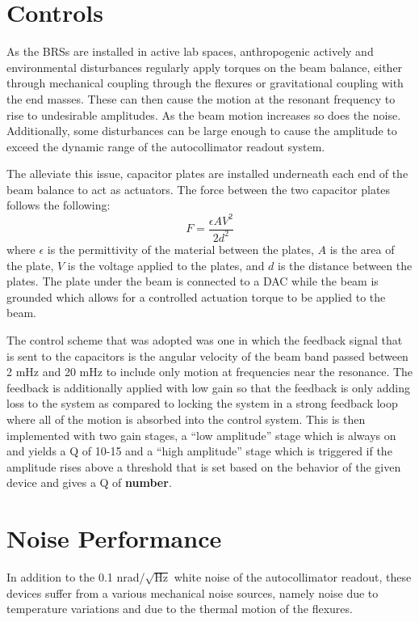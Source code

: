\documentclass [12pt, proquest]{uwthesis}[2019]
\begin{document}
\section{Controls}

\quad As the BRSs are installed in active lab spaces, anthropogenic actively and environmental disturbances regularly apply torques on the beam balance, either through mechanical coupling through the flexures or gravitational coupling with the end masses. These can then cause the motion at the resonant frequency to rise to undesirable amplitudes. As the beam motion increases so does the noise. Additionally, some disturbances can be large enough to cause the amplitude to exceed the dynamic range of the autocollimator readout system.

The alleviate this issue, capacitor plates are installed underneath each end of the beam balance to act as actuators. The force between the two capacitor plates follows the following: 
\begin{equation}
F=\frac{\epsilon A V^2}{2d^2} \label{cap}
\end{equation}
where $\epsilon$ is the permittivity of the material between the plates, $A$ is the area of the plate, $V$ is the voltage applied to the plates, and $d$ is the distance between the plates. The plate under the beam is connected to a DAC while the beam is grounded which allows for a controlled actuation torque to be applied to the beam. 

The control scheme that was adopted was one in which the feedback signal that is sent to the capacitors is the angular velocity of the beam band passed between 2 mHz and 20 mHz to include only motion at frequencies near the resonance. The feedback is additionally applied with low gain so that the feedback is only adding loss to the system as compared to locking the system in a strong feedback loop where all of the motion is absorbed into the control system. This is then implemented with two gain stages, a ``low amplitude'' stage which is always on and yields a Q of 10-15 and a ``high amplitude'' stage which is triggered if the amplitude rises above a threshold that is set based on the behavior of the given device and gives a Q of \textbf{number}.

\section{Noise Performance}

In addition to the 0.1 nrad/$\sqrt{\text{Hz}}$ white noise of the autocollimator readout, these devices suffer from a various mechanical noise sources, namely noise due to temperature variations and due to the thermal motion of the flexures.
\end{document}
